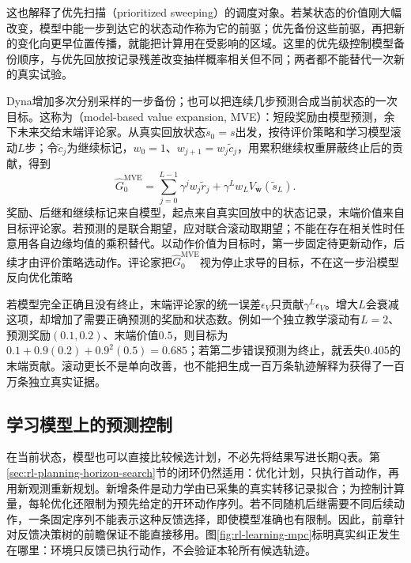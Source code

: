 这也解释了优先扫描（prioritized sweeping）的调度对象。若某状态的价值刚大幅改变，模型中能一步到达它的状态动作称为它的前驱；优先备份这些前驱，再把新的变化向更早位置传播，就能把计算用在受影响的区域。这里的优先级控制模型备份顺序，与优先回放按记录残差改变抽样概率相关但不同；两者都不能替代一次新的真实试验。

Dyna增加多次分别采样的一步备份；也可以把连续几步预测合成当前状态的一次目标。这称为（model-based value expansion, MVE）：短段奖励由模型预测，余下未来交给末端评论家。从真实回放状态$\widetilde s_0=s$出发，按待评价策略和学习模型滚动$L$步；令$\widetilde c_j$为继续标记，$w_0=1$、$w_{j+1}=w_j\widetilde c_j$，用累积继续权重屏蔽终止后的贡献，得到
\begin{equation}
  \widehat G^{\mathrm{MVE}}_0
  =\sum_{j=0}^{L-1}\gamma^j w_j\widetilde r_j
    +\gamma^L w_L V_{\bar{\bm w}}(\widetilde s_L).
  \label{eq:rl-learning-mve}
\end{equation}
奖励、后继和继续标记来自模型，起点来自真实回放中的状态记录，末端价值来自目标评论家。若预测的是联合期望，应对联合滚动取期望；不能在存在相关性时任意用各自边缘均值的乘积替代。以动作价值为目标时，第一步固定待更新动作，后续才由评价策略选动作。评论家把$\widehat G^{\mathrm{MVE}}_0$视为停止求导的目标，不在这一步沿模型反向优化策略

若模型完全正确且没有终止，末端评论家的统一误差$\epsilon_V$只贡献$\gamma^L\epsilon_V$。增大$L$会衰减这项，却增加了需要正确预测的奖励和状态数。例如一个独立教学滚动有$L=2$、预测奖励$(0.1,0.2)$、末端价值$0.5$，则目标为$0.1+0.9(0.2)+0.9^2(0.5)=0.685$；若第二步错误预测为终止，就丢失$0.405$的末端贡献。滚动更长不是单向改善，也不能把生成一百万条轨迹解释为获得了一百万条独立真实证据。

\subsection{学习模型上的预测控制}
\label{sec:rl-learning-learned-mpc}

在当前状态，模型也可以直接比较候选计划，不必先将结果写进长期Q表。第\ref{sec:rl-planning-horizon-search}节的闭环仍然适用：优化计划，只执行首动作，再用新观测重新规划。新增条件是动力学由已采集的真实转移记录拟合；为控制计算量，每轮优化还限制为预先给定的开环动作序列。若不同随机后继需要不同后续动作，一条固定序列不能表示这种反馈选择，即使模型准确也有限制。因此，前章针对反馈决策树的前瞻保证不能直接移用。图\ref{fig:rl-learning-mpc}标明真实纠正发生在哪里：环境只反馈已执行动作，不会验证本轮所有候选轨迹。

